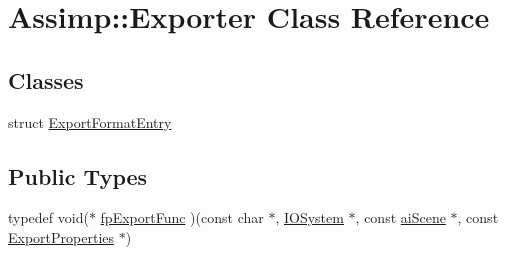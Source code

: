 \hypertarget{class_assimp_1_1_exporter}{\section{Assimp\-:\-:Exporter Class Reference}
\label{class_assimp_1_1_exporter}
}
\subsection*{Classes}
\begin{DoxyCompactItemize}
\item 
struct \hyperlink{struct_assimp_1_1_exporter_1_1_export_format_entry}{Export\-Format\-Entry}
\end{DoxyCompactItemize}
\subsection*{Public Types}
\begin{DoxyCompactItemize}
\item 
typedef void($\ast$ \hyperlink{class_assimp_1_1_exporter_a2e0f2340bca5a7e4f443cbc256928e88}{fp\-Export\-Func} )(const char $\ast$, \hyperlink{class_assimp_1_1_i_o_system}{I\-O\-System} $\ast$, const \hyperlink{structai_scene}{ai\-Scene} $\ast$, const \hyperlink{class_assimp_1_1_export_properties}{Export\-Properties} $\ast$)
\end{DoxyCompactItemize}
